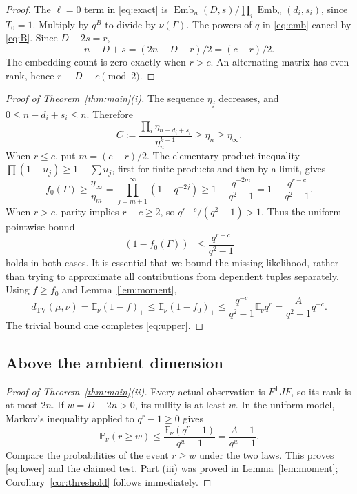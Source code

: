 \documentclass[11pt,letterpaper]{article}
\theoremstyle{definition}
\theoremstyle{remark}
\newcommand{\E}{\mathbb E}
\newcommand{\Prob}{\mathbb P}
\newcommand{\TV}{d_{\mathrm{TV}}}
\newcommand{\Emb}{\operatorname{Emb}}
\begin{document}
\begin{proof}
The $\ell=0$ term in \eqref{eq:exact} is $\Emb_n(D,s)/\prod_i\Emb_n(d_i,s_i)$, since $T_0=1$. Multiply by $q^B$ to divide by $\nu(\Gamma)$. The powers of $q$ in \eqref{eq:emb} cancel by \eqref{eq:B}. Since $D-2s=r$,
\[
 n-D+s=(2n-D-r)/2=(c-r)/2.
\]
The embedding count is zero exactly when $r>c$. An alternating matrix has even rank, hence $r\equiv D\equiv c\pmod2$.
\end{proof}

\begin{proof}[Proof of Theorem~\ref{thm:main}(i)]
The sequence $\eta_j$ decreases, and $0\le n-d_i+s_i\le n$. Therefore
\begin{equation}\label{eq:C-lower}
 C:=\frac{\prod_i\eta_{n-d_i+s_i}}{\eta_n^{k-1}}
 \ge\eta_n\ge\eta_\infty.
\end{equation}
When $r\le c$, put $m=(c-r)/2$. The elementary product inequality $\prod(1-u_j)\ge1-\sum u_j$, first for finite products and then by a limit, gives
\[
 f_0(\Gamma)\ge\frac{\eta_\infty}{\eta_m}
 =\prod_{j=m+1}^\infty(1-q^{-2j})
 \ge1-\frac{q^{-2m}}{q^2-1}
 =1-\frac{q^{r-c}}{q^2-1}.
\]
When $r>c$, parity implies $r-c\ge2$, so $q^{r-c}/(q^2-1)>1$. Thus the uniform pointwise bound
\begin{equation}\label{eq:likelihood-deficit}
 (1-f_0(\Gamma))_+\le\frac{q^{r-c}}{q^2-1}
\end{equation}
holds in both cases. It is essential that we bound the missing likelihood, rather than trying to approximate all contributions from dependent tuples separately. Using $f\ge f_0$ and Lemma~\ref{lem:moment},
\[
 \TV(\mu,\nu)=\E_\nu(1-f)_+
 \le\E_\nu(1-f_0)_+
 \le\frac{q^{-c}}{q^2-1}\E_\nu q^r
 =\frac{A}{q^2-1}q^{-c}.
\]
The trivial bound one completes \eqref{eq:upper}.
\end{proof}

\subsection{Above the ambient dimension}

\begin{proof}[Proof of Theorem~\ref{thm:main}(ii)]
Every actual observation is $F^{\mathsf T}JF$, so its rank is at most $2n$. If $w=D-2n>0$, its nullity is at least $w$. In the uniform model, Markov's inequality applied to $q^r-1\ge0$ gives
\[
 \Prob_\nu(r\ge w)\le\frac{\E_\nu(q^r-1)}{q^w-1}
 =\frac{A-1}{q^w-1}.
\]
Compare the probabilities of the event $r\ge w$ under the two laws. This proves \eqref{eq:lower} and the claimed test. Part (iii) was proved in Lemma~\ref{lem:moment}; Corollary~\ref{cor:threshold} follows immediately.
\end{proof}
\end{document}

